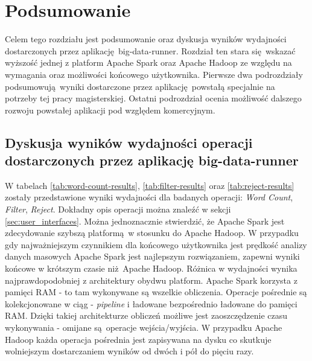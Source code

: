 \chapter{Podsumowanie} \label{chap.summary}
Celem tego rozdziału jest podsumowanie oraz dyskusja wyników wydajności dostarczonych przez aplikację big-data-runner. Rozdział ten stara się wskazać wyższość jednej z platform Apache Spark oraz Apache Hadoop ze względu na wymagania oraz możliwości końcowego użytkownika. Pierwsze dwa podrozdziały podsumowują wyniki dostarczone przez aplikację powstałą specjalnie na potrzeby tej pracy magisterskiej. Ostatni podrozdział ocenia możliwość dalszego rozwoju powstałej aplikacji pod względem komercyjnym.   
\section{Dyskusja wyników wydajności operacji dostarczonych przez aplikację big-data-runner}
W tabelach \ref{tab:word-count-results}, \ref{tab:filter-results} oraz \ref{tab:reject-results} zostały przedstawione wyniki wydajności dla badanych operacji: \textit{Word Count}, \textit{Filter}, \textit{Reject}. Dokładny opis operacji można znaleźć w sekcji \ref{sec:user_interfaces}. Można jednoznacznie stwierdzić, że Apache Spark jest zdecydowanie szybszą platformą w stosunku do Apache Hadoop. W przypadku gdy najważniejszym czynnikiem dla końcowego użytkownika jest prędkość analizy danych masowych Apache Spark jest najlepszym rozwiązaniem, zapewni wyniki końcowe w krótszym czasie niż Apache Hadoop. Różnica w wydajności wynika najprawdopodobniej z architektury obydwu platform. Apache Spark korzysta z pamięci RAM - to tam wykonywane są wszelkie obliczenia. Operacje pośrednie są kolekcjonowane w ciąg - \textit{pipeline} i ładowane bezpośrednio ładowane do pamięci RAM. Dzięki takiej architekturze obliczeń możliwe jest zaoszczędzenie czasu wykonywania - omijane są operacje wejścia/wyjścia. W przypadku Apache Hadoop każda operacja pośrednia jest zapisywana na dysku co skutkuje wolniejszym dostarczaniem wyników od dwóch i pół do pięciu razy.

